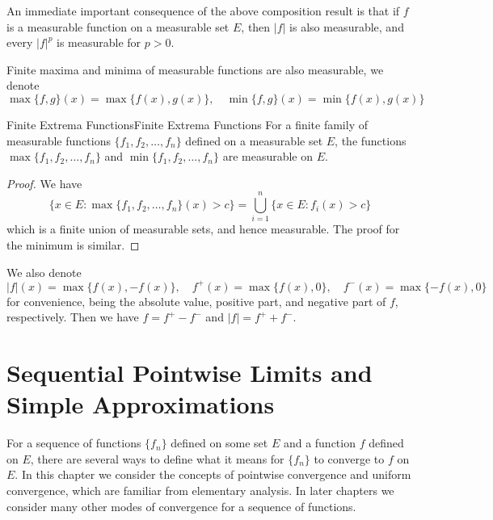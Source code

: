 \documentclass[../main.tex]{subfiles}
\begin{document}
An immediate important consequence of the above composition result is that if $f$ is a measurable function on a measurable set $E$, then $|f|$ is also measurable, and every $|f|^p$ is measurable for $p > 0$.

Finite maxima and minima of measurable functions are also measurable, we denote
\begin{equation*}
	\max\{f,g\}(x) = \max\{f(x), g(x)\}, \quad \min\{f,g\}(x) = \min\{f(x), g(x)\}
\end{equation*}

\begin{proposition}{Finite Extrema Functions}{Finite Extrema Functions}
	For a finite family of measurable functions $\{f_1, f_2, \ldots, f_n\}$ defined on a measurable set $E$, the functions $\max\{f_1, f_2, \ldots, f_n\}$ and $\min\{f_1, f_2, \ldots, f_n\}$ are measurable on $E$.
\end{proposition}
\begin{proof}
	We have
	\begin{equation*}
		\{x \in E : \max\{f_1, f_2, \ldots, f_n\}(x) > c\} = \bigcup_{i=1}^{n} \{x \in E : f_i(x) > c\}
	\end{equation*}
	which is a finite union of measurable sets, and hence measurable. The proof for the minimum is similar.
\end{proof}

We also denote
\begin{equation*}
	|f|(x) = \max\{f(x), -f(x)\}, \quad f^+(x) = \max\{f(x), 0\}, \quad f^-(x) = \max\{-f(x), 0\}
\end{equation*}
for convenience, being the absolute value, positive part, and negative part of $f$, respectively. Then we have $f = f^+ - f^-$ and $|f| = f^+ + f^-$.

\section{Sequential Pointwise Limits and Simple Approximations}
For a sequence of functions $\{f_n\}$ defined on some set $E$ and a function $f$ defined on $E$, there are several ways to define what it means for $\{f_n\}$ to converge to $f$ on $E$. In this chapter we consider the concepts of pointwise convergence and uniform convergence, which are familiar from elementary analysis. In later chapters we consider many other modes of convergence for a sequence of functions.
\end{document}
